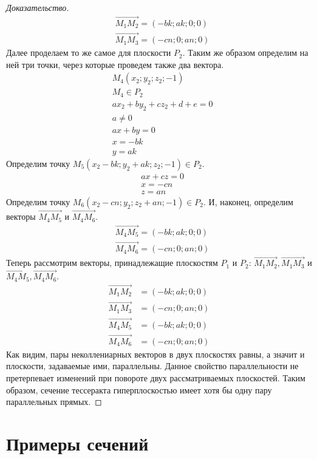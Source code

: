\documentclass[12pt, a4paper, twoside]{report}
\begin{document}
\begin{proof}[Доказательство]
\begin{align*}
	&\overrightarrow{M_1M_2}=(-bk;ak;0;0) \\
	&\overrightarrow{M_1M_3}=(-cn;0;an;0) 
\end{align*}
Далее проделаем то же самое для плоскости $P_2$. Таким же образом определим на ней три точки, через которые проведем также два вектора.
\begin{align*}
	&M_4(x_2;y_2;z_2;-1) \\
 &M_4 \in P_2 \\
	&ax_2+by_2+cz_2+d+e=0 \\
	&a \ne0 \\
	&ax+by=0 \\
	&x=-bk \\
	&y=ak 
\end{align*}
Определим точку $M_5(x_2-bk;y_2+ak;z_2;-1) \in P_2$. 
\begin{align*}
	&ax+cz=0 \\
	&x=-cn \\
	&z=an
\end{align*}
Определим точку $M_6(x_2-cn;y_2;z_2+an;-1) \in P_2$. И, наконец, определим векторы $\overrightarrow{M_4M_5}$ и $\overrightarrow{M_4M_6}$.
\begin{align*}
	&\overrightarrow{M_4M_5}=(-bk;ak;0;0) \\
	&\overrightarrow{M_4M_6}=(-cn;0;an;0) 
\end{align*}
Теперь рассмотрим векторы, принадлежащие плоскостям $P_1$ и $P_2$: $\overrightarrow{M_1M_2}, \overrightarrow{M_1M_3}$ и $\overrightarrow{M_4M_5}, \overrightarrow{M_4M_6}$.
\begin{align*}
	\overrightarrow{M_1M_2}&=(-bk;ak;0;0) \\
	\overrightarrow{M_1M_3}&=(-cn;0;an;0) \\
	\overrightarrow{M_4M_5}&=(-bk;ak;0;0) \\
	\overrightarrow{M_4M_6}&=(-cn;0;an;0)
\end{align*}
Как видим, пары неколлениарных векторов в двух плоскостях равны, а значит и плоскости, задаваемые ими, параллельны. Данное свойство параллельности не претерпевает изменений при повороте двух рассматриваемых плоскостей. Таким образом, сечение тессеракта гиперплоскостью имеет хотя бы одну пару параллельных прямых.

\end{proof}

\section{Примеры сечений}
\end{document}
